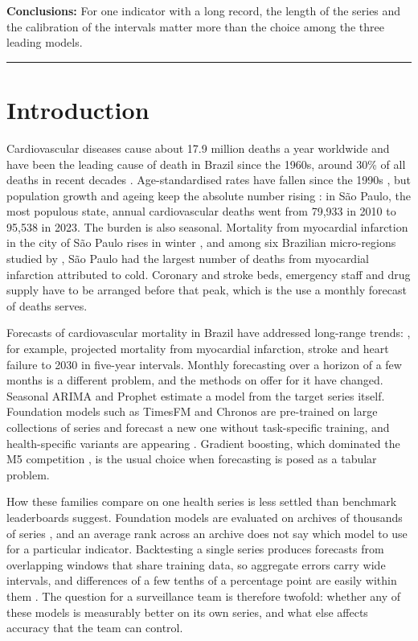 \textbf{Conclusions:} For one indicator with a long record, the length of the series and the calibration of the intervals matter more than the choice among the three leading models.

\vspace{1em}
\hrule

\section{Introduction}

Cardiovascular diseases cause about 17.9 million deaths a year worldwide \citep{roth2020}
and have been the leading cause of death in Brazil since the 1960s, around 30\% of all
deaths in recent decades \citep{oliveira2020, brant2017}. Age-standardised rates have fallen
since the 1990s \citep{ribeiro2016}, but population growth and ageing keep the absolute
number rising \citep{brant2025}: in S\~ao Paulo, the most populous state, annual
cardiovascular deaths went from 79{,}933 in 2010 to 95{,}538 in 2023. The burden is also
seasonal. Mortality from myocardial infarction in the city of S\~ao Paulo rises in winter
\citep{sharovsky2002}, and among six Brazilian micro-regions studied by \citet{ferreira2019},
S\~ao Paulo had the largest number of deaths from myocardial infarction attributed to cold. Coronary and stroke beds, emergency staff
and drug supply have to be arranged before that peak, which is the use a monthly forecast
of deaths serves. 

Forecasts of cardiovascular mortality in Brazil have addressed long-range trends:
\citet{siqueira2020}, for example, projected mortality from myocardial
infarction, stroke and heart failure to 2030 in five-year intervals. Monthly forecasting
over a horizon of a few months is a different problem, and the methods on offer for it have
changed. Seasonal ARIMA \citep{box2015} and Prophet \citep{taylor2018} estimate a model from
the target series itself. Foundation models such as TimesFM \citep{das2024} and Chronos
\citep{ansari2024} are pre-trained on large collections of series and forecast a new one
without task-specific training, and health-specific variants are appearing \citep{li2025}.
Gradient boosting, which dominated the M5 competition \citep{makridakis2022}, is the usual choice
when forecasting is posed as a tabular problem.

How these families compare on one health series is less settled than benchmark leaderboards
suggest. Foundation models are evaluated on archives of thousands of series
\citep{godahewa2021, aksu2024}, and an average rank across an archive does not say which
model to use for a particular indicator. Backtesting a single series produces forecasts from
overlapping windows that share training data, so aggregate errors carry wide intervals, and
differences of a few tenths of a percentage point are easily within them
\citep{hewamalage2023}. The question for a surveillance team is therefore twofold: whether
any of these models is measurably better on its own series, and what else affects accuracy
that the team can control.

